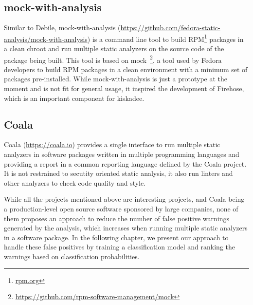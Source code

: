 \subsection{mock-with-analysis}

Similar to Debile, mock-with-analysis
(\url{https://github.com/fedora-static-analysis/mock-with-analysis}) is a
command line tool to build RPM\footnote{\url{rpm.org}} packages in a clean
chroot and run multiple static analyzers on the source code of the package
being built. This tool is based on
mock~\footnote{\url{https://github.com/rpm-software-management/mock}}, a tool
used by Fedora developers to build RPM packages in a clean environment with a
minimum set of packages pre-installed. While mock-with-analysis is just a
prototype at the moment and is not fit for general usage, it inspired the
development of Firehose, which is an important component for kiskadee.

\subsection{Coala}

Coala (\url{https://coala.io}) provides a single interface to run multiple
static analyzers in software packages written in multiple programming languages
and providing a report in a common reporting language defined by the Coala
project. It is not restrained to secutity oriented static analysis, it also run
linters and other analyzers to check code quality and style.

While all the projects mentioned above are interesting projects, and Coala
being a production-level open source software sponsored by large companies,
none of them proposes an approach to reduce the number of false positive
warnings generated by the analysis, which increases when running multiple
static analyzers in a software package. In the following chapter, we present
our approach to handle these false positives by training a classification model
and ranking the warnings based on classification probabilities.

